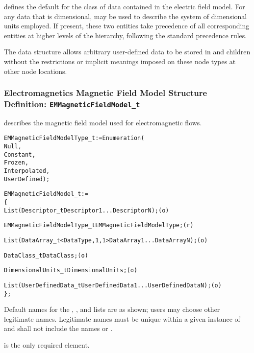  defines the default for the class of data contained in
the electric field model.
For any data that is dimensional,  may be used to
describe the system of dimensional units employed.
If present, these two entities take precedence of all corresponding
entities at higher levels of the hierarchy, following the standard
precedence rules.

The  data structure allows arbitrary
user-defined data to be stored in  and
 children without the restrictions or implicit
meanings imposed on these node types at other node locations.

\subsubsection{Electromagnetics Magnetic Field Model Structure Definition: \texttt{EMMagneticFieldModel\_t}}

 describes the magnetic field model used
for electromagnetic flows.
\begin{alltt}
  EMMagneticFieldModelType\_t := Enumeration(
    Null,
    Constant,
    Frozen,
    Interpolated,
    UserDefined ) ;
\end{alltt}

\begin{alltt}
  EMMagneticFieldModel\_t :=
    \{
    List( Descriptor\_t Descriptor1 ... DescriptorN ) ;                      (o)

    EMMagneticFieldModelType\_t EMMagneticFieldModelType ;                   (r)
    
    List( DataArray\_t<DataType, 1, 1> DataArray1 ... DataArrayN ) ;         (o)

    DataClass\_t DataClass ;                                                 (o)
                
    DimensionalUnits\_t DimensionalUnits ;                                   (o)

    List( UserDefinedData\_t UserDefinedData1 ... UserDefinedDataN ) ;       (o)
    \} ;
\end{alltt}

\begin{notes}
\item Default names for the , , and
      lists are as shown; users may choose other legitimate names.
      Legitimate names must be unique within a given instance of
       and shall not include the names
       or .
\item {} is the only required element.
\end{notes}

